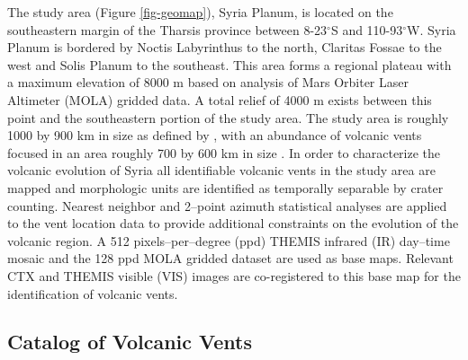 The study area (Figure \ref{fig-geomap}), Syria Planum, is located on the southeastern margin of the Tharsis province between 8-23$^{\circ}$S and 110-93$^{\circ}$W. Syria Planum is bordered by Noctis Labyrinthus to the north, Claritas Fossae to the west and Solis Planum to the southeast. This area forms a regional plateau with a maximum elevation of 8000 m based on analysis of Mars Orbiter Laser Altimeter (MOLA) \citep{Smith2003} gridded data. A total relief of 4000 m exists between this point and the southeastern portion of the study area. The study area is roughly 1000 by 900 km in size as defined by \citet{Scott1986}, with an abundance of volcanic vents focused in an area roughly 700 by 600 km in size \citep{Richardson2010,Richardson2012}. In order to characterize the volcanic evolution of Syria all identifiable volcanic vents in the study area are mapped and morphologic units are identified as temporally separable by crater counting. Nearest neighbor and 2--point azimuth statistical analyses are applied to the vent location data to provide additional constraints on the evolution of the volcanic region. A 512 pixels--per--degree (ppd) THEMIS infrared (IR) day--time mosaic \citep{Christensen2004} and the 128 ppd MOLA gridded dataset \citep{Smith2003} are used as base maps. Relevant CTX \citep{Malin2007} and THEMIS visible (VIS) \citep{Christensen2004} images are co-registered to this base map for the identification of volcanic vents.

\subsection{Catalog of Volcanic Vents}


